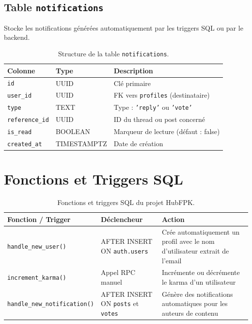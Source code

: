\documentclass[12pt, a4paper]{report}
\begin{document}
\subsection{Table \texttt{notifications}}

Stocke les notifications générées automatiquement par les triggers SQL ou par le backend.

\begin{table}[H]
\centering
\renewcommand{\arraystretch}{1.3}
\begin{tabularx}{\textwidth}{l l X}
\toprule
\textbf{Colonne} & \textbf{Type} & \textbf{Description} \\
\midrule
\texttt{id} & UUID & Clé primaire \\
\texttt{user\_id} & UUID & FK vers \texttt{profiles} (destinataire) \\
\texttt{type} & TEXT & Type : \texttt{'reply'} ou \texttt{'vote'} \\
\texttt{reference\_id} & UUID & ID du thread ou post concerné \\
\texttt{is\_read} & BOOLEAN & Marqueur de lecture (défaut : false) \\
\texttt{created\_at} & TIMESTAMPTZ & Date de création \\
\bottomrule
\end{tabularx}
\caption{Structure de la table \texttt{notifications}.}
\end{table}

\section{Fonctions et Triggers SQL}

\begin{table}[H]
\centering
\renewcommand{\arraystretch}{1.3}
\begin{tabularx}{\textwidth}{l l X}
\toprule
\textbf{Fonction / Trigger} & \textbf{Déclencheur} & \textbf{Action} \\
\midrule
\texttt{handle\_new\_user()} & AFTER INSERT ON \texttt{auth.users} & Crée automatiquement un profil avec le nom d'utilisateur extrait de l'email \\
\texttt{increment\_karma()} & Appel RPC manuel & Incrémente ou décrémente le karma d'un utilisateur \\
\texttt{handle\_new\_notification()} & AFTER INSERT ON \texttt{posts} et \texttt{votes} & Génère des notifications automatiques pour les auteurs de contenu \\
\bottomrule
\end{tabularx}
\caption{Fonctions et triggers SQL du projet HubFPK.}
\end{table}
\end{document}
